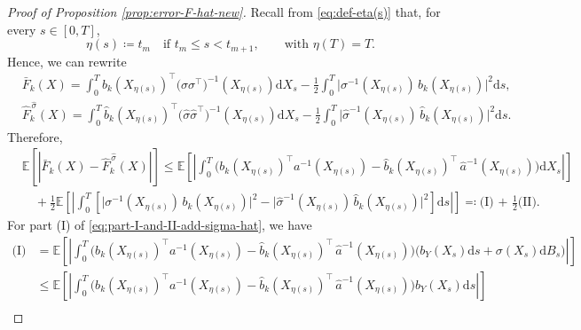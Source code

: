 \documentclass{article}
\theoremstyle{plain}
\newtheorem{lemma}[theorem]{Lemma}
\theoremstyle{definition}
\theoremstyle{remark}
\renewcommand{\d}{\mathrm{d}}
\newcommand{\RD}{\mathbb{R}^{d}}
\newcommand{\EE}{\mathbb{E}}
\begin{document}





\begin{proof}[Proof of Proposition \ref{prop:error-F-hat-new}]
Recall from \eqref{eq:def-eta(s)} that, for every $s\in[0,T]$,
\[
\eta(s)\coloneqq t_m \quad \text{if } t_m \le s < t_{m+1}, \qquad \text{with } \eta(T)=T.
\]
Hence, we can rewrite
\begin{align}\label{eq:F-bar-rewrite}
&\bar{F}_k(X)
= \int_{0}^{T}b_k(X_{\eta(s)})^{\top} \big(\sigma\sigma^{\top}\big)^{-1}(X_{\eta(s)})\d X_s - \frac{1}{2}\int_{0}^{T} \big\lvert \sigma^{-1} (X_{\eta(s)})\,b_k(X_{\eta(s)}) \big\rvert^2 \d s,\nonumber\\
&\widehat{F}^{\,\widehat{\sigma}}_k(X)=\int_{0}^{T} \widehat{b}_k(X_{\eta(s)})^{\top} \big(\widehat{\sigma}\widehat{\sigma}^{\top}\big)^{-1}(X_{\eta(s)})\d X_s - \frac{1}{2}\int_{0}^{T} \big\lvert \widehat{\sigma}^{-1} (X_{\eta(s)})\,\widehat{b}_k(X_{\eta(s)}) \big\rvert^2 \d s.
\end{align}
Therefore, 
\begin{align}\label{eq:part-I-and-II-add-sigma-hat}
    &\EE \left[ |\bar F_k(X)-\widehat F^{\,\widehat{\sigma}}_k(X)|\right]\leq  \EE \left[\left|\int_{0}^T \Big( b_k(X_{\eta(s)})^{\top}a^{-1}(X_{\eta(s)})-\widehat b_k(X_{\eta(s)})^{\top}\,\widehat{a}^{-1}(X_{\eta(s)})\Big)\d X_s\right|\right]\nonumber\\
     &\quad +\frac{1}{2}\EE \left[\left|\int_0^T \left[\big\lvert \sigma^{-1} (X_{\eta(s)})\,b_k(X_{\eta(s)}) \big\rvert^2-\big\lvert \widehat{\sigma}^{-1} (X_{\eta(s)})\,\widehat{b}_k(X_{\eta(s)}) \big\rvert^2\right]\d s\right|\right]\eqqcolon \text{(I) + $\frac{1}{2}$(II)}.
\end{align}
For part (I) of \eqref{eq:part-I-and-II-add-sigma-hat}, we have
\begin{align}\label{eq:I}
 \text{(I)} & =   \EE \left[\left|\int_{0}^T \Big( b_k(X_{\eta(s)})^{\top}a^{-1}(X_{\eta(s)})-\widehat b_k(X_{\eta(s)})^{\top}\,\widehat{a}^{-1}(X_{\eta(s)})\Big)\Big(b_Y(X_s) \d s + \sigma(X_s) \d B_s \Big)\right|\right]\nonumber\\
 & \leq \EE \left[\left|\int_{0}^T \Big( b_k(X_{\eta(s)})^{\top}a^{-1}(X_{\eta(s)})-\widehat b_k(X_{\eta(s)})^{\top}\,\widehat{a}^{-1}(X_{\eta(s)})\Big)b_Y(X_s) \d s \right|\right]\nonumber\\

\end{align}
\end{proof}
\end{document}
